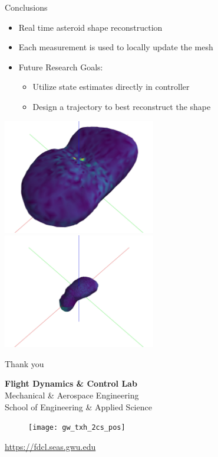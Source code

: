 \documentclass[11pt,professionalfonts,aspectratio=169]{beamer}
\begin{document}
\begin{frame}{Conclusions}
    \begin{itemize}
        \item Real time asteroid shape reconstruction 
        \item Each measurement is used to locally update the mesh
        \item Future Research Goals:
            \begin{itemize}
                \item Utilize state estimates directly in controller
                \item Design a trajectory to best reconstruct the shape
            \end{itemize}
    \end{itemize} 

    \begin{center}
        \includegraphics[width=0.5\textwidth,keepaspectratio,height=0.5\textheight]{figures/castalia/final_az=45_el=30.jpg}~
        \includegraphics[width=0.5\textwidth, keepaspectratio,height=0.5\textheight]{figures/itokawa/final_az=45_el=30.jpg}
    \end{center}
\end{frame}

\begin{frame}[c]{Thank you}
  \centering
  
  \textbf{\large Flight Dynamics \& Control Lab} \\
  Mechanical \& Aerospace Engineering \\
  School of Engineering \& Applied Science
  
  \begin{figure} %
        \texttt{[image: gw\_txh\_2cs\_pos]}
    \end{figure}
  
  \url{https://fdcl.seas.gwu.edu}
\end{frame}
\end{document}
